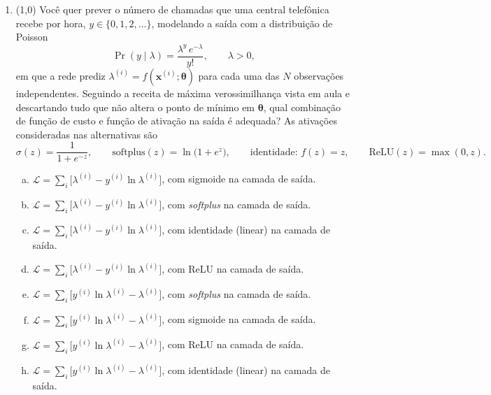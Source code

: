 \documentclass[11pt,a4paper]{article}
\begin{document}
\begin{enumerate}[1)]
\item (1{,}0) Você quer prever o número de chamadas que uma central telefônica recebe por hora, $y \in \{0, 1, 2, \ldots\}$, modelando a saída com a distribuição de Poisson
\[
\Pr(y \mid \lambda) = \frac{\lambda^{y}\,e^{-\lambda}}{y!}, \qquad \lambda > 0 ,
\]
em que a rede prediz $\lambda^{(i)} = f(\mathbf{x}^{(i)}; \boldsymbol{\theta})$ para cada uma das $N$ observações independentes. Seguindo a receita de máxima verossimilhança vista em aula e descartando tudo que não altera o ponto de mínimo em $\boldsymbol{\theta}$, qual combinação de função de custo e função de ativação na saída é adequada? As ativações consideradas nas alternativas são
\[
\sigma(z) = \frac{1}{1 + e^{-z}}, \qquad
\mathrm{softplus}(z) = \ln\bigl(1 + e^{z}\bigr), \qquad
\text{identidade: } f(z) = z, \qquad
\mathrm{ReLU}(z) = \max(0, z).
\]

\begin{enumerate}[a)]
    \item $\mathcal{L} = \sum_{i}\bigl[\lambda^{(i)} - y^{(i)}\ln\lambda^{(i)}\bigr]$, com sigmoide na camada de saída.
    \item $\mathcal{L} = \sum_{i}\bigl[\lambda^{(i)} - y^{(i)}\ln\lambda^{(i)}\bigr]$, com \textit{softplus} na camada de saída.
    \item $\mathcal{L} = \sum_{i}\bigl[\lambda^{(i)} - y^{(i)}\ln\lambda^{(i)}\bigr]$, com identidade (linear) na camada de saída.
    \item $\mathcal{L} = \sum_{i}\bigl[\lambda^{(i)} - y^{(i)}\ln\lambda^{(i)}\bigr]$, com ReLU na camada de saída.
    \item $\mathcal{L} = \sum_{i}\bigl[y^{(i)}\ln\lambda^{(i)} - \lambda^{(i)}\bigr]$, com \textit{softplus} na camada de saída.
    \item $\mathcal{L} = \sum_{i}\bigl[y^{(i)}\ln\lambda^{(i)} - \lambda^{(i)}\bigr]$, com sigmoide na camada de saída.
    \item $\mathcal{L} = \sum_{i}\bigl[y^{(i)}\ln\lambda^{(i)} - \lambda^{(i)}\bigr]$, com ReLU na camada de saída.
    \item $\mathcal{L} = \sum_{i}\bigl[y^{(i)}\ln\lambda^{(i)} - \lambda^{(i)}\bigr]$, com identidade (linear) na camada de saída.
\end{enumerate}

\end{enumerate}
\end{document}
